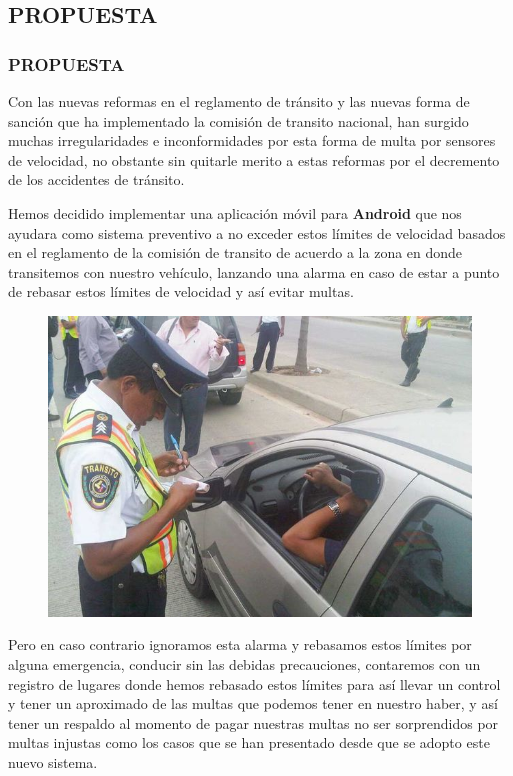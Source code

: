 \documentclass{beamer}						%
\begin{document}
	\begin{frame}[allowframebreaks]
		\section{PROPUESTA}
		\frametitle{PROPUESTA}
			\Large{
			Con  las nuevas reformas en el reglamento de tránsito y las nuevas forma de sanción que 
			ha implementado la comisión de transito nacional, han surgido muchas irregularidades e inconformidades
			por esta forma de multa por sensores de velocidad, no obstante sin quitarle merito a estas reformas por
			 el decremento de los accidentes de tránsito.\\

			\flushleft
			Hemos decidido implementar una aplicación móvil para \textbf{Android} que nos ayudara como sistema preventivo a 
			no exceder estos límites de velocidad basados en el reglamento de la comisión de transito de acuerdo a 
			la zona en donde transitemos con nuestro vehículo,  lanzando una alarma en caso de estar a punto de rebasar estos límites de velocidad y así evitar multas.
			
			\begin{figure}[H]%
				\centering
				\includegraphics[scale=0.25]{./images/citacion.jpg}
			\end{figure}
			Pero en caso contrario ignoramos esta alarma y rebasamos estos límites por alguna emergencia, conducir sin 
			las debidas precauciones, contaremos con un registro de lugares donde hemos rebasado estos límites para así 
			llevar un control y tener un aproximado de las multas que podemos tener en nuestro haber, y así tener un 
			respaldo al momento de pagar nuestras multas no ser sorprendidos por multas injustas como los casos que se han 
			presentado desde que se adopto este nuevo sistema.\\
			
}
\end{frame}
\end{document}

